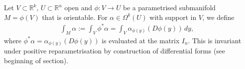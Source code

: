 \begin{definition}\label{def:int-param-subm-k-form}
	Let $V \subset \mathbb{R}^{k}$, $U \subset \mathbb{R}^{n}$ open and $\phi: V \to U$ be a parametrised submanifold $M = \phi(V)$ that is orientable. For $\alpha \in \Omega^{k}(U)$ with support in $V$, we define
	\begin{align*}
		\int_{M} \alpha := \int_{V} \phi^* \alpha =  \int_{V} \alpha_{\phi(y)} (D \phi(y)) \, dy,
	\end{align*}
	where $\phi^*\alpha = \alpha_{\phi(y)}(D \phi(y))$ is evaluated at the matrix $I_{n}$. This is invariant under positive reparametrisation by construction of differential forms (see beginning of section). 
\end{definition}

